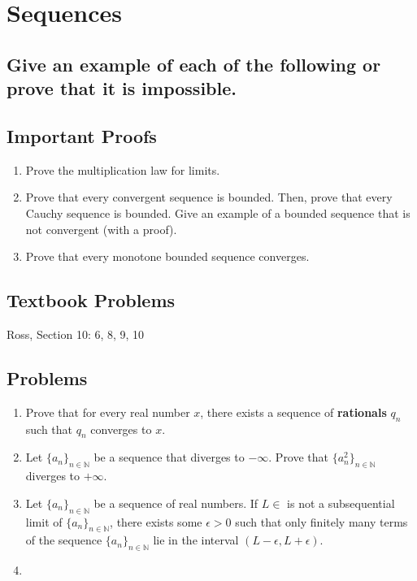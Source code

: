 \documentclass{article}
\theoremstyle{definition}
\begin{document}
\newpage

\section{Sequences}

\subsection{Give an example of each of the following or prove that it is impossible.}





\subsection{Important Proofs}

\begin{enumerate}
    \item Prove the multiplication law for limits.
    
    \item Prove that every convergent sequence is bounded. Then, prove that every Cauchy sequence is bounded. Give an example of a bounded sequence that is not convergent (with a proof).
   
    \item Prove that every monotone bounded sequence converges.
    
\end{enumerate}

\subsection{Textbook Problems}

Ross, Section 10: 6, 8, 9, 10

\subsection{Problems}

\begin{enumerate}
    \item Prove that for every real number $x$, there exists a sequence of \textbf{rationals} $q_{n}$ such that $q_{n}$ converges to $x$.
    \item Let \( \{a_n\}_{n \in \mathbb{N}} \) be a sequence that diverges to $- \infty$. Prove that \( \{a_n^{2}\}_{n \in \mathbb{N}} \) diverges to $+ \infty$.

    \item Let \( \{a_n\}_{n \in \mathbb{N}} \) be a sequence of real numbers. If $L \in $ is not a subsequential limit of \( \{a_n\}_{n \in \mathbb{N}} \), there exists some $\epsilon > 0$ such that only finitely many terms of the sequence \( \{a_n\}_{n \in \mathbb{N}} \) lie in the interval $(L - \epsilon, L + \epsilon)$.

    \item 
\end{enumerate}
\end{document}
